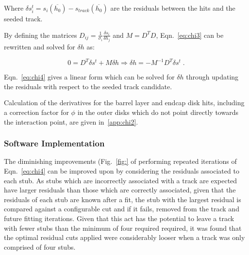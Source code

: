 Where $\delta s_{i}^{t} = s_{i}(\overline{h_{0}}) - s_{track}(\overline{h_{0}})$ are the residuals between the hits and the seeded track.

By defining the matrices $D_{ij} = \frac{1}{\sigma_{i}} \frac{\delta s_{i}}{\delta h_{j}}$ and $M = D^{T} D$, Eqn.~\ref{eq:chi3} can be rewritten and solved for $\delta h$ as:

\begin{equation}
0 = D^{T} \delta s^{t} + M \delta h \Rightarrow \delta h = - M^{-1} D^{T} \delta s^{t} \;.
\label{eq:chi4}
\end{equation}

Eqn.~\ref{eq:chi4} gives a linear form which can be solved for $\delta h$ through updating the residuals with respect to the seeded track candidate.

Calculation of the derivatives for the barrel layer and endcap disk hits, including a correction factor for $\phi$ in the outer disks which do not point directly towards the interaction point, are given in~\ref{app:chi2}.

\subsubsection{Software Implementation}\label{subsubsec:chi2software}

The diminishing improvements (Fig.~\ref{fig:} of performing repeated iterations of Eqn.~\ref{eq:chi4} can be improved upon by considering the residuals associated to each stub.
As stubs which are incorrectly associated with a track are expected have larger residuals than those which are correctly associated, given that the residuals of each stub are known after a fit, the stub with the largest residual is compared against a configurable cut and if it fails, removed from the track and future fitting iterations.
Given that this act has the potential to leave a track with fewer stubs than the minimum of four required required, it was found that the optimal residual cuts applied were considerably looser when a track was only comprised of four stubs.



